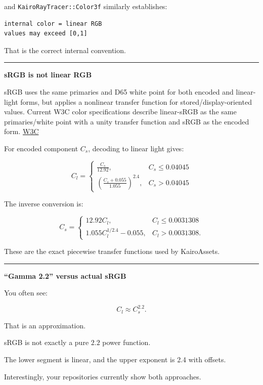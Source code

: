 and \texttt{KairoRayTracer::Color3f} similarly establishes:

\begin{verbatim}
internal color = linear RGB
values may exceed [0,1]
\end{verbatim}

That is the correct internal convention.

\begin{center}\rule{0.5\linewidth}{0.5pt}\end{center}

\textbf{sRGB is not linear RGB}

sRGB uses the same primaries and D65 white point for both encoded and linear-light forms, but applies a nonlinear transfer function for stored/display-oriented values. Current W3C color specifications describe linear-sRGB as the same primaries/white point with a unity transfer function and sRGB as the encoded form. \href{https://www.w3.org/TR/css-color/?utm_source=chatgpt.com}{W3C}

For encoded component \(C_s\), decoding to linear light gives:

\[
\boxed{
C_l=
\begin{cases}
\frac{C_s}{12.92},
&
C_s\le0.04045
\\[6pt]
\left(
\frac{C_s+0.055}{1.055}
\right)^{2.4},
&
C_s>0.04045
\end{cases}
}
\]

The inverse conversion is:

\[
\boxed{
C_s=
\begin{cases}
12.92C_l,
&
C_l\le0.0031308
\\[6pt]
1.055C_l^{1/2.4}-0.055,
&
C_l>0.0031308.
\end{cases}
}
\]

These are the exact piecewise transfer functions used by KairoAssets.

\begin{center}\rule{0.5\linewidth}{0.5pt}\end{center}

\textbf{``Gamma 2.2'' versus actual sRGB}

You often see:

\[
C_l\approx C_s^{2.2}.
\]

That is an approximation.

sRGB is not exactly a pure \(2.2\) power function.

The lower segment is linear, and the upper exponent is 2.4 with offsets.

Interestingly, your repositories currently show both approaches.


